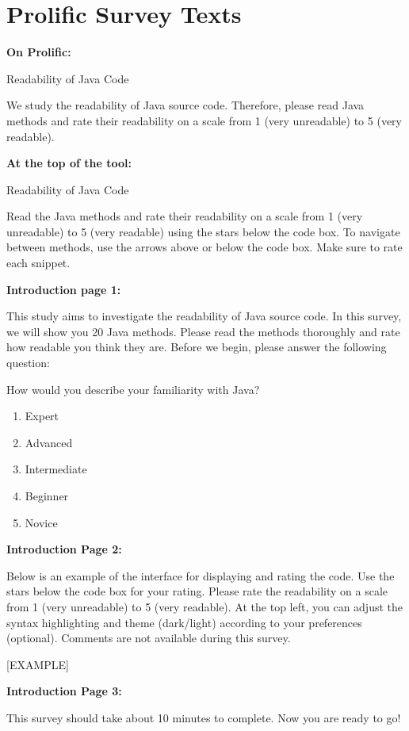 \documentclass[%
class=scrreprt,
chapterprefix=false,%
open=right,%
twoside=false,%
paper=a4,%
logofile={Logo\_zentral\_farbig\_EN.png},%
thesistype=master,%
UKenglish,%
]{se2thesis}
\theoremstyle{definition}
\begin{document}
\pagebreak
\section{Prolific Survey Texts}\label{appendix:prolific-survey-texts}
	\textbf{On Prolific:}
	
	Readability of Java Code
	
	We study the readability of Java source code. Therefore, please read Java methods and rate their readability on a scale from 1 (very unreadable) to 5 (very readable).
	
	\textbf{At the top of the tool:}
	
	Readability of Java Code
	
	Read the Java methods and rate their readability on a scale from 1 (very unreadable) to 5 (very readable) using the stars below the code box. To navigate between methods, use the arrows above or below the code box. Make sure to rate each snippet.
	
	\textbf{Introduction page 1:}
	
	This study aims to investigate the readability of Java source code. In this survey, we will show you 20 Java methods. Please read the methods thoroughly and rate how readable you think they are. Before we begin, please answer the following question:
	
	How would you describe your familiarity with Java?
	\begin{enumerate}
		\item Expert
		\item Advanced
		\item Intermediate
		\item Beginner
		\item Novice
	\end{enumerate}
	
	\textbf{Introduction Page 2:}
	
	Below is an example of the interface for displaying and rating the code. Use the stars below the code box for your rating. Please rate the readability on a scale from 1 (very unreadable) to 5 (very readable). At the top left, you can adjust the syntax highlighting and theme (dark/light) according to your preferences (optional). Comments are not available during this survey.
	
	[EXAMPLE]
	
	\textbf{Introduction Page 3:}
	
	This survey should take about 10 minutes to complete. Now you are ready to go! 
\end{document}
